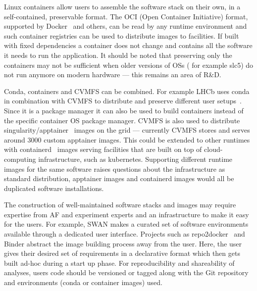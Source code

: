 Linux containers allow users to assemble the software stack on their own, in a self-contained, preservable format. The OCI (Open Container Initiative) format, supported by Docker~\cite{docker} and others, can be read by any runtime environment and such container registries can be used to distribute images to facilities. If built with fixed dependencies a container does not change and contains all the software it needs to run the application. It should be noted that preserving only the containers may not be sufficient when older versions of OSs ( for example slc5)  do not run anymore on modern hardware --- this remains an area of R\&D. 

Conda, containers and CVMFS can be combined. For example LHCb uses conda in combination with CVMFS to distribute and preserve different user setups~\cite{lbconda}. Since it is a package manager it can also be used to build containers instead of the specific container OS package manager. CVMFS is also used to distribute singularity/apptainer~\cite{singularity} images on the grid --- currently CVMFS stores and serves around 3000 custom apptainer images. This could be extended to other runtimes with containerd~\cite{containerd} images serving facilities that are built on top of cloud-computing infrastructure, such as kubernetes. Supporting different runtime images for the same software raises questions about the infrastructure as standard distribution, apptainer images and containerd images would all be duplicated software installations.

The construction of well-maintained software stacks and  images may require expertise from AF and experiment experts and an infrastructure to make it easy for the users. For example, SWAN makes a curated set of software environments available through a dedicated user interface. Projects such as repo2docker~\cite{repotodocker} and Binder abstract the image building process away from the user. Here, the user gives their desired set of requirements in a declarative format which then gets built ad-hoc during a start up phase. For reproducibility and shareability of analyses, users code should be versioned or tagged along with the Git repository and environments (conda or container images) used.
